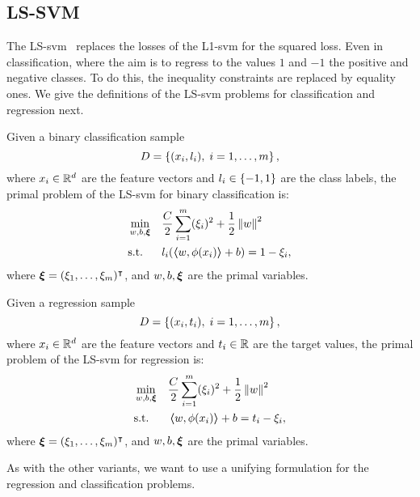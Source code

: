 \subsection{LS-SVM}
%
The LS-\acrshort{svm}~\citep{SuykensV99} replaces the losses of the L1-\acrshort{svm} for the squared loss.
Even in classification, where the aim is to regress to the values $1$ and $-1$ the positive and negative classes.
To do this, the inequality constraints are replaced by equality ones.
%
We give the definitions of the LS-\acrshort{svm} problems for classification and regression next.
\begin{definition}
    Given a binary classification sample
    $$ D = \left\{(x_i, l_i), \; i=1, \ldots, m\right\} ,$$
    where $x_i \in \mathbb{R}^d$ are the feature vectors and $l_i \in \left\{-1, 1\right\}$ are the class labels, 
    the primal problem of the LS-\acrshort{svm} for binary classification is:
    \begin{equation}
        \label{eq:ls_primal_clas}
        \begin{aligned}
            &\min_{w, b, \fv{\xi}} & & \frac{C}{2} \sum_{i=1}^m (\xi_i)^2 + \frac{1}{2} \norm{w}^2 \\
            & \text{s.t.} & & l_i (\dotp{w}{\phi(x_i)} + b) = 1 - \xi_i , 
        \end{aligned}  
    \end{equation}
    where $\bm{\xi} = (\xi_1, \ldots, \xi_m)^\intercal$, and $w, b, \bm{\xi}$ are the primal variables.
\end{definition}
%
\begin{definition}
    Given a regression sample
    $$ D = \left\{(x_i, t_i), \; i=1, \ldots, m\right\} ,$$
    where $x_i \in \mathbb{R}^d$ are the feature vectors and $t_i \in \mathbb{R}$ are the target values, 
    the primal problem of the LS-\acrshort{svm} for regression is:
    \begin{equation}
        \label{eq:ls_primal_reg}
        \begin{aligned}
            &\min_{w, b, \fv{\xi}} & & \frac{C}{2} \sum_{i=1}^m (\xi_i)^2 + \frac{1}{2} \norm{w}^2 \\
            & \text{s.t.} & & \dotp{w}{\phi(x_i)} + b = t_i - \xi_i  , \\
        \end{aligned}  
    \end{equation}
    where $\bm{\xi} = (\xi_1, \ldots, \xi_m)^\intercal$, and $w, b, \bm{\xi}$ are the primal variables.
\end{definition}
%
As with the other variants, we want to use a unifying formulation for the regression and classification problems.


